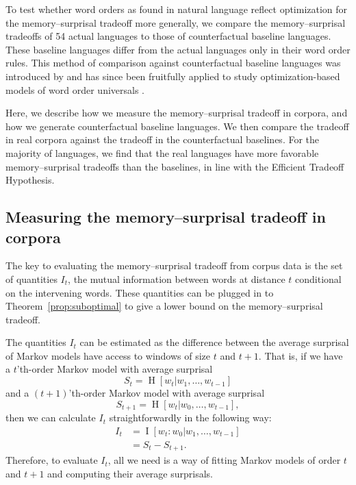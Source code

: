 To test whether word orders as found in natural language reflect optimization for the memory--surprisal tradeoff more generally, we compare the memory--surprisal tradeoffs of 54 actual languages to those of counterfactual baseline languages. These baseline languages differ from the actual languages only in their word order rules. This method of comparison against counterfactual baseline languages was introduced by \citet{gildea-optimizing-2007,gildea-grammars-2010} and has since been fruitfully applied to study optimization-based models of word order universals  \citep{futrell-large-scale-2015,gildea-human-2015,hahn2020universals}.

Here, we describe how we measure the memory--surprisal tradeoff in corpora, and how we generate counterfactual baseline languages. We then compare the tradeoff in real corpora against the tradeoff in the counterfactual baselines. For the majority of languages, we find that the real languages have more favorable memory--surprisal tradeoffs than the baselines, in line with the Efficient Tradeoff Hypothesis.

\subsection{Measuring the memory--surprisal tradeoff in corpora}
\label{sec:measuring}

The key to evaluating the memory--surprisal tradeoff from corpus data is the set of quantities $I_t$, the  mutual information between words at distance $t$ conditional on the intervening words. %
These quantities can be plugged in to Theorem~\ref{prop:suboptimal} to give a lower bound on the memory--surprisal tradeoff.

The quantities $I_t$ can be estimated as the difference between the average surprisal of Markov models have access to windows of size $t$ and $t+1$.
That is, if we have a $t$'th-order Markov model with average surprisal
\begin{equation}
    \label{eq:S_t}
    S_t = \operatorname{H}[w_t | w_1, \dots, w_{t-1}]
\end{equation}
and a $(t+1)$'th-order Markov model with average surprisal
\begin{equation*}
    S_{t+1} = \operatorname{H}[w_t | w_0, \dots, w_{t-1}],
\end{equation*}
then we can calculate $I_t$ straightforwardly in the following way:
\begin{align}
    \nonumber
    I_t &= \operatorname{I}[w_t : w_0 | w_1, \dots, w_{t-1}] \\
    \nonumber
    &= S_t - S_{t+1}.
\end{align}
Therefore, to evaluate $I_t$, all we need is a way of fitting Markov models of order $t$ and $t+1$ and computing their average surprisals.

